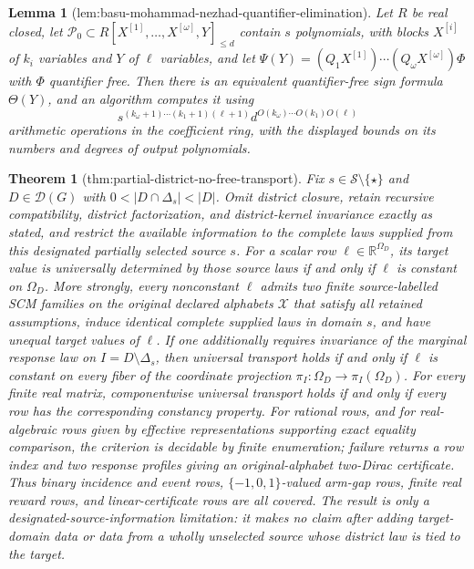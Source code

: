\documentclass{article}
\newtheorem{theorem}{Theorem}
\newtheorem{lemma}{Lemma}
\begin{document}
\begin{lemma}[lem:basu-mohammad-nezhad-quantifier-elimination]\label{lem:basu-mohammad-nezhad-quantifier-elimination}
Let \(R\) be real closed, let \(\mathcal P_0\subset R[X^{[1]},\ldots,X^{[\omega]},Y]_{\le d}\) contain \(s\) polynomials, with blocks \(X^{[i]}\) of \(k_i\) variables and \(Y\) of \(\ell\) variables, and let \(\Psi(Y)=(Q_1X^{[1]})\cdots(Q_\omega X^{[\omega]})\Phi\) with \(\Phi\) quantifier free.  Then there is an equivalent quantifier-free sign formula \(\Theta(Y)\), and an algorithm computes it using
\[
s^{(k_\omega+1)\cdots(k_1+1)(\ell+1)}
d^{O(k_\omega)\cdots O(k_1)O(\ell)}
\]
arithmetic operations in the coefficient ring, with the displayed bounds on its numbers and degrees of output polynomials.
\end{lemma}

\begin{theorem}[thm:partial-district-no-free-transport]\label{thm:partial-district-no-free-transport}
Fix \(s\in\mathcal S\setminus\{\star\}\) and \(D\in\mathcal D(G)\) with \(0<|D\cap\Delta_s|<|D|\).  Omit district closure, retain recursive compatibility, district factorization, and district-kernel invariance exactly as stated, and restrict the available information to the complete laws supplied from this designated partially selected source \(s\).  For a scalar row \(\ell\in\mathbb R^{\Omega_D}\), its target value is universally determined by those source laws if and only if \(\ell\) is constant on \(\Omega_D\).  More strongly, every nonconstant \(\ell\) admits two finite source-labelled SCM families on the original declared alphabets \(\mathcal X\) that satisfy all retained assumptions, induce identical complete supplied laws in domain \(s\), and have unequal target values of \(\ell\).  If one additionally requires invariance of the marginal response law on \(I=D\setminus\Delta_s\), then universal transport holds if and only if \(\ell\) is constant on every fiber of the coordinate projection \(\pi_I:\Omega_D\to\pi_I(\Omega_D)\).  For every finite real matrix, componentwise universal transport holds if and only if every row has the corresponding constancy property.  For rational rows, and for real-algebraic rows given by effective representations supporting exact equality comparison, the criterion is decidable by finite enumeration; failure returns a row index and two response profiles giving an original-alphabet two-Dirac certificate.  Thus binary incidence and event rows, \(\{-1,0,1\}\)-valued arm-gap rows, finite real reward rows, and linear-certificate rows are all covered.  The result is only a designated-source-information limitation: it makes no claim after adding target-domain data or data from a wholly unselected source whose district law is tied to the target.
\end{theorem}
\end{document}
